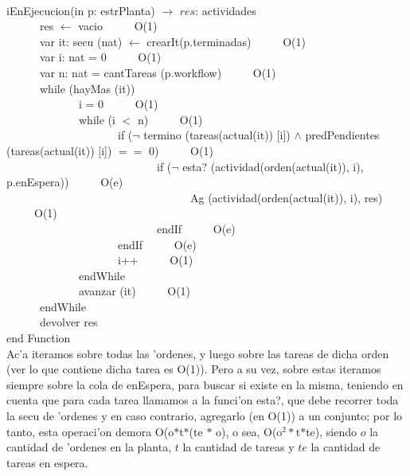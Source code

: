 \documentclass[a4paper,10pt]{article}
\begin{document}
\begin{algoritmo}
\caption{}\\
  iEnEjecucion(in p: estrPlanta) $\rightarrow$ $res$: actividades \\
	\indent \ \ \ \ \ \  res $\gets$ vacio  \ \ \ \ \ O(1)\\
	\indent \ \ \ \ \ \  var it: secu (nat) $\gets$ crearIt(p.terminadas)  \ \ \ \ \ O(1)\\
	\indent \ \ \ \ \ \  var i: nat = 0  \ \ \ \ \ O(1)\\
	\indent \ \ \ \ \ \  var n: nat = cantTareas (p.workflow)  \ \ \ \ \ O(1)\\
	\indent \ \ \ \ \ \  while (hayMas (it))  \ \ \ \ \ \\
	\indent \ \ \ \ \ \ \ \ \ \ \ \ \ i = 0 \ \ \ \ \ O(1) \\
	\indent \ \ \ \ \ \ \ \ \ \ \ \ \ while (i $<$ n) \ \ \ \ \ O(1) \\
	\indent \ \ \ \ \ \ \ \ \ \ \ \ \ \ \ \ \ \ \ \ if ($\neg$ termino (tareas(actual(it)) [i]) $\wedge$ predPendientes (tareas(actual(it)) [i]) $==$ 0)  \ \ \ \ \ O(1) \\
	\indent \ \ \ \ \ \ \ \ \ \ \ \ \ \ \ \ \ \ \ \ \ \ \ \ \ \ \ if ($\neg$ esta? (actividad(orden(actual(it)), i), p.enEspera)) \ \ \ \ \ O(e) \\
	\indent \ \ \ \ \ \ \ \ \ \ \ \ \ \ \ \ \ \ \ \ \ \ \ \ \ \ \ \ \ \ \ \ \ Ag (actividad(orden(actual(it)), i), res) \ \ \ \ \ O(1) \\
	\indent \ \ \ \ \ \ \ \ \ \ \ \ \ \ \ \ \ \ \ \ \ \ \ \ \ \ \ endIf \ \ \ \ \ O(e) \\
	\indent \ \ \ \ \ \ \ \ \ \ \ \ \ \ \ \ \ \ \ \ endIf \ \ \ \ \ O(e) \\
	\indent \ \ \ \ \ \ \ \ \ \ \ \ \ \ \ \ \ \ \ \ i++ \ \ \ \ \ O(1) \\
	\indent \ \ \ \ \ \ \ \ \ \ \ \ \ endWhile \ \ \ \ \ \\
	\indent \ \ \ \ \ \ \ \ \ \ \ \ \ avanzar (it) \ \ \ \ \ O(1)\\
	\indent \ \ \ \ \ \ endWhile \ \ \ \ \ \\
	\indent \ \ \ \ \ \  devolver res    \\
   end Function \\

Ac'a iteramos sobre todas las 'ordenes, y luego sobre las tareas de dicha orden (ver lo que contiene dicha tarea es O(1)). Pero a su vez, sobre estas iteramos siempre sobre la cola de enEspera, para buscar si existe en la misma, teniendo en cuenta que para cada tarea llamamos a la funci'on esta?, que debe recorrer toda la secu de 'ordenes y en caso contrario, agregarlo (en O(1)) a un conjunto; por lo tanto, esta operaci'on demora O(o$*$t$*$(te $*$ o), o sea, O(o$^{2}*$t$*$te), siendo $o$ la cantidad de 'ordenes en la planta, $t$ la cantidad de tareas y $te$ la cantidad de tareas en espera.
\end{algoritmo}
\end{document}

